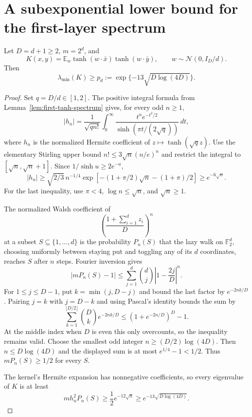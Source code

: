 \section{A subexponential lower bound for the first-layer spectrum}
\label{sec:critical-subexponential-spectrum}

\begin{theorem}
\label{thm:first-tanh-subexponential-spectrum}
Let $D=d+1\ge2$, $m=2^d$, and
\[
 K(x,y)=\mathbb E_w\tanh(w\cdot\bar x)\tanh(w\cdot\bar y),
 \qquad w\sim\mathcal N(0,I_D/d).
\]
Then
\[
 \lambda_{\min}(K)\ge
 p_d:=\exp\{-13\sqrt{D\log(4D)}\}.
\]
\end{theorem}

\begin{proof}
Set $q=D/d\in[1,2]$. The positive integral formula from
Lemma~\ref{lem:first-tanh-spectrum} gives, for every odd $n\ge1$,
\[
 |h_n|=\frac1{\sqrt{qn!}}\int_0^\infty
       \frac{t^ne^{-t^2/2}}{\sinh(\pi t/(2\sqrt q))}\,dt,
\]
where $h_n$ is the normalized Hermite coefficient of
$z\mapsto\tanh(\sqrt qz)$.
Use the elementary Stirling upper bound
$n!\le3\sqrt n(n/e)^n$ and restrict the integral to
$[\sqrt n,\sqrt n+1]$. Since $1/\sinh u\ge2e^{-u}$,
\[
 |h_n|\ge\sqrt{2/3}\,n^{-1/4}
 \exp\left[-(1+\pi/2)\sqrt n-(1+\pi)/2\right]
 \ge e^{-6\sqrt n}.
\]
For the last inequality, use $\pi<4$, $\log n\le\sqrt n$,
and $\sqrt n\ge1$.

The normalized Walsh coefficient of
\[
 \left(\frac{1+\sum_{i=1}^d z_i}{D}\right)^n
\]
at a subset $S\subseteq\{1,\ldots,d\}$ is the probability
$P_n(S)$ that the lazy walk on $\mathbb F_2^d$, choosing uniformly
between staying put and toggling any of its $d$ coordinates, reaches
$S$ after $n$ steps. Fourier inversion gives
\[
 |mP_n(S)-1|
 \le\sum_{j=1}^{d}\binom dj\left|1-\frac{2j}{D}\right|^n.
\]
For $1\le j\le D-1$, put $k=\min(j,D-j)$ and bound the last
factor by $e^{-2nk/D}$. Pairing $j=k$ with $j=D-k$ and using
Pascal's identity bounds the sum by
\[
 \sum_{k=1}^{\lfloor D/2\rfloor}\binom Dk e^{-2nk/D}
 \le(1+e^{-2n/D})^D-1.
\]
At the middle index when $D$ is even this only overcounts, so the
inequality remains valid.
Choose the smallest odd integer
$n\ge(D/2)\log(4D)$. Then $n\le D\log(4D)$ and the displayed
sum is at most $e^{1/4}-1<1/2$. Thus $mP_n(S)\ge1/2$ for every
$S$.

The kernel's Hermite expansion has nonnegative coefficients, so every
eigenvalue of $K$ is at least
\[
 m h_n^2P_n(S)\ge\frac12 e^{-12\sqrt n}
 \ge e^{-13\sqrt{D\log(4D)}}.
\]
\end{proof}

